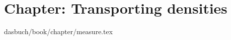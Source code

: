 %
%
%

\section{Chapter: Transporting densities}
\label{c-measure}\noindent dasbuch/book/chapter/measure.tex

